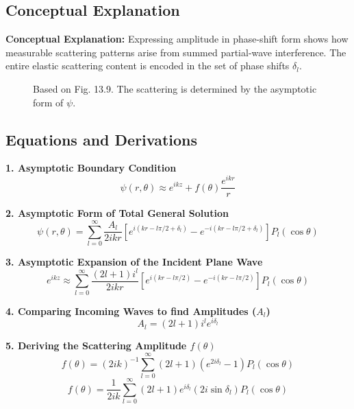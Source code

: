 \documentclass[12pt]{report}
\begin{document}
\subsection{Conceptual Explanation}
\textbf{Conceptual Explanation:} Expressing amplitude in phase-shift form shows how measurable scattering patterns arise from summed partial-wave interference. The entire elastic scattering content is encoded in the set of phase shifts $\delta_l$.


\begin{figure}[H]
    \centering
    
    \caption{Based on Fig. 13.9. The scattering is determined by the asymptotic form of $\psi$.}
\end{figure}

\subsection*{Equations and Derivations}

\textbf{1. Asymptotic Boundary Condition}
\begin{equation}
\psi(r, \theta) \approx e^{ikz} + f(\theta) \frac{e^{ikr}}{r}
\end{equation}

\textbf{2. Asymptotic Form of Total General Solution}
\begin{equation}
\psi(r, \theta) = \sum_{l=0}^{\infty} \frac{A_l}{2ikr} \left[ e^{i(kr - l\pi/2 + \delta_l)} - e^{-i(kr - l\pi/2 + \delta_l)} \right] P_l(\cos \theta)
\end{equation}

\textbf{3. Asymptotic Expansion of the Incident Plane Wave}
\begin{equation}
e^{ikz} \approx \sum_{l=0}^{\infty} \frac{(2l+1)i^l}{2ikr} \left[ e^{i(kr - l\pi/2)} - e^{-i(kr - l\pi/2)} \right] P_l(\cos \theta)
\end{equation}

\textbf{4. Comparing Incoming Waves to find Amplitudes ($A_l$)}
\begin{equation}
A_l = (2l+1) i^l e^{i\delta_l}
\end{equation}

\textbf{5. Deriving the Scattering Amplitude $f(\theta)$}
\begin{equation}
f(\theta) = (2ik)^{-1} \sum_{l=0}^{\infty} (2l+1) \left( e^{2i\delta_l} - 1 \right) P_l(\cos \theta)
\end{equation}
\begin{equation}
f(\theta) = \frac{1}{2ik} \sum_{l=0}^{\infty} (2l+1) e^{i\delta_l} (2i \sin \delta_l) P_l(\cos \theta)
\end{equation}
\end{document}

